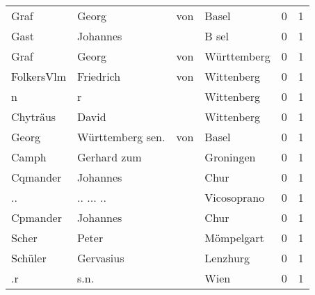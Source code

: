 \documentclass[10pt,a4paper,landscape]{article}
\begin{document}
\begin{longtable}{llllrr}
                     Graf &                              Georg &         von &                                       Basel &          0 &         1 \\
                     Gast &                           Johannes &             &                                       B sel &          0 &         1 \\
                     Graf &                              Georg &         von &                                 Württemberg &          0 &         1 \\
               FolkersVlm &                          Friedrich &         von &                                  Wittenberg &          0 &         1 \\
                        n &                                  r &             &                                  Wittenberg &          0 &         1 \\
                 Chyträus &                              David &             &                                  Wittenberg &          0 &         1 \\
                    Georg &                   Württemberg sen. &         von &                                       Basel &          0 &         1 \\
                    Camph &                        Gerhard zum &             &                                   Groningen &          0 &         1 \\
                 Cqmander &                           Johannes &             &                                        Chur &          0 &         1 \\
                       .. &                          .. ... .. &             &                                 Vicosoprano &          0 &         1 \\
                 Cpmander &                           Johannes &             &                                        Chur &          0 &         1 \\
                    Scher &                              Peter &             &                                  Mömpelgart &          0 &         1 \\
                  Schüler &                          Gervasius &             &                                    Lenzhurg &          0 &         1 \\
                       .r &                               s.n. &             &                                        Wien &          0 &         1 \\

\end{longtable}
\end{document}
